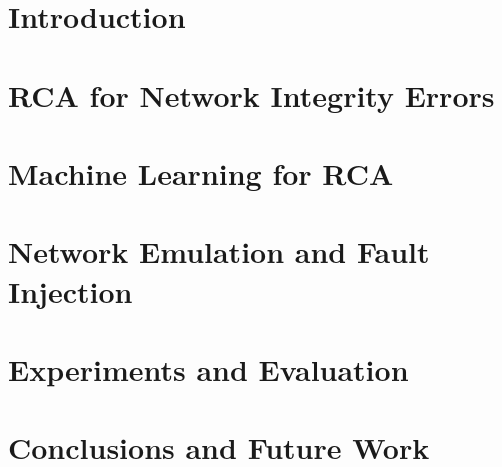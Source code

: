 \documentclass[conference]{IEEEtran}
\begin{document}


\begin{abstract}

\end{abstract}

\section{Introduction}
\label{sec:introduction}


\section{RCA for Network Integrity Errors}
\label{sec:integrity}


\section{Machine Learning for RCA}
\label{sec:ml}


\section{Network Emulation and Fault Injection}
\label{sec:emulation}


\section{Experiments and Evaluation}
\label{sec:evaluation}


\section{Conclusions and Future Work}
\label{sec:future}





%

\end{document}
